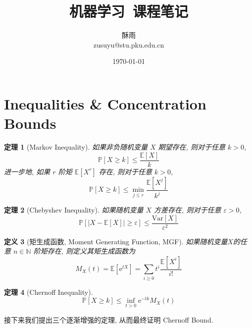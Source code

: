 \documentclass[8pt]{article}
\title{\heiti\zihao{1} 机器学习\ 课程笔记}
\author{\kaishu\zihao{-3} 酥雨\\zusuyu@stu.pku.edu.cn}
\date{\today}
\theoremstyle{compact}
\newtheorem{theorem}{定理}[section]
\newtheorem{definition}[theorem]{定义}
\def\le{\leqslant}
\def\ge{\geqslant}
\def\P#1{\mathbb{P}\left[{#1}\right]}
\def\E#1{\mathbb{E}\left[{#1}\right]}
\def\Var#1{\text{Var}\left[{#1}\right]}
\def\e{\mathrm{e}}
\begin{document}
\pagestyle{plain}

\maketitle
\tableofcontents
\newpage

\section{Inequalities \& Concentration Bounds}
\begin{theorem}[Markov Inequality]
	如果非负随机变量 $X$ 期望存在, 则对于任意 $k > 0$,  $$\P{X \ge k} \le \frac{\E{X}}{k}$$
	进一步地, 如果 $r$ 阶矩 $\E{X^r}$ 存在, 则对于任意 $k > 0$, $$\P{X \ge k} \le \min_{j \le r}\frac{\E{X^j}}{k^j}$$
\end{theorem}
\begin{theorem}[Chebyshev Inequality]
	如果随机变量 $X$ 方差存在, 则对于任意 $\varepsilon > 0$, $$\P{|X - \E{X}| \ge \varepsilon} \le \frac{\Var{X}}{\varepsilon^2}$$
\end{theorem}
\begin{definition}[矩生成函数, Moment Generating Function, MGF]
	如果随机变量$X$的任意 $n \in \mathbb N$ 阶矩存在, 则定义其矩生成函数为 $$M_X(t) = \E{\e^{tX}} = \sum_{i \ge 0}t^i\frac{\E{X^i}}{i!}$$
\end{definition}
\begin{theorem}[Chernoff Inequality]
	$$\P{X \ge k} \le \inf_{t > 0}\e^{-tk}M_X(t)$$
\end{theorem}

接下来我们提出三个逐渐增强的定理, 从而最终证明 Chernoff Bound.
\end{document}

